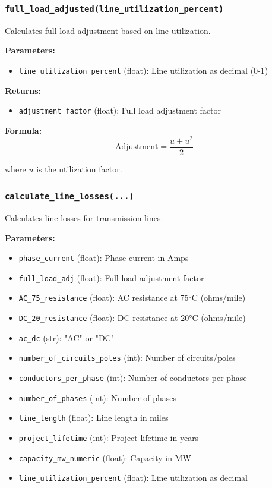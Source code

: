 \documentclass[ctcc_full_documentation.tex]{subfiles}
\begin{document}
\subsubsection{\texttt{full\_load\_adjusted(line\_utilization\_percent)}}

Calculates full load adjustment based on line utilization.

\textbf{Parameters:}
\begin{itemize}
    \item \texttt{line\_utilization\_percent} (float): Line utilization as decimal (0-1)
\end{itemize}

\textbf{Returns:}
\begin{itemize}
    \item \texttt{adjustment\_factor} (float): Full load adjustment factor
\end{itemize}

\textbf{Formula:}
\[
\text{Adjustment} = \frac{u + u^2}{2}
\]

where $u$ is the utilization factor.

\subsubsection{\texttt{calculate\_line\_losses(...)}}

Calculates line losses for transmission lines.

\textbf{Parameters:}
\begin{itemize}
    \item \texttt{phase\_current} (float): Phase current in Amps
    \item \texttt{full\_load\_adj} (float): Full load adjustment factor
    \item \texttt{AC\_75\_resistance} (float): AC resistance at 75°C (ohms/mile)
    \item \texttt{DC\_20\_resistance} (float): DC resistance at 20°C (ohms/mile)
    \item \texttt{ac\_dc} (str): "AC" or "DC"
    \item \texttt{number\_of\_circuits\_poles} (int): Number of circuits/poles
    \item \texttt{conductors\_per\_phase} (int): Number of conductors per phase
    \item \texttt{number\_of\_phases} (int): Number of phases
    \item \texttt{line\_length} (float): Line length in miles
    \item \texttt{project\_lifetime} (int): Project lifetime in years
    \item \texttt{capacity\_mw\_numeric} (float): Capacity in MW
    \item \texttt{line\_utilization\_percent} (float): Line utilization as decimal
\end{itemize}
\end{document}
